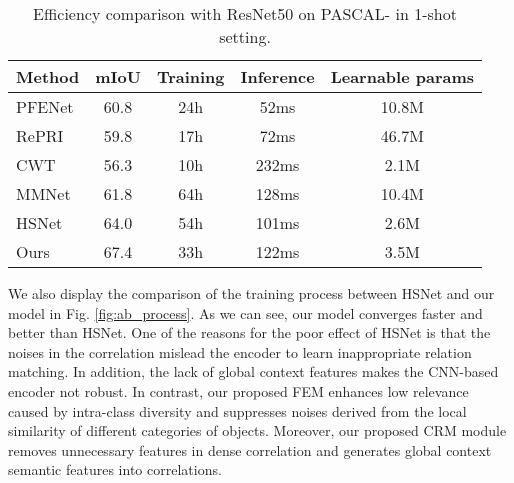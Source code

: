 \documentclass[journal]{IEEEtran}
\begin{document}
\begin{table}[t]
\renewcommand\arraystretch{1.2}
	\caption{Efficiency comparison with ResNet50 on PASCAL-\cite{shaban2017one} in 1-shot setting.}
	\label{table:efficiency}
	
	\begin{center}
		\begin{tabular}{lcccc}
			\hline
			\textbf{Method} & \textbf{mIoU} & \textbf{Training} & \textbf{Inference} & \textbf{  Learnable params}\\
			\hline
			 {PFENet \cite{tian2020prior} } &  { 60.8 } &  { 24h    } &  { 52ms     } &  { 10.8M}       \\     
			 {RePRI \cite{boudiaf2021few}  } &  { 59.8 } &  { 17h    } &  { 72ms      } &  { 46.7M}           \\   
			 {CWT \cite{lu2021simpler}  } &  { 56.3 } &  { 10h    } &  { 232ms      } &  { 2.1M }    \\     
			 {MMNet \cite{wu2021learning}  } &  { 61.8 } &  { 64h    } &  { 128ms      } &  { 10.4M }   \\ 
			HSNet\cite{min2021hypercorrelation}  & 64.0& 54h &101ms &2.6M  \\
			Ours   &67.4& 33h &122ms &3.5M  \\
			\hline
			
		\end{tabular}
	\end{center}
\end{table}

We also display the comparison of the training process between HSNet and our model in Fig. \ref{fig:ab_process}. As we can see, our model converges faster and better than HSNet. One of the reasons for the poor effect of HSNet is that the noises in the correlation mislead the encoder to learn inappropriate relation matching. In addition, the lack of global context features makes the CNN-based encoder not robust. In contrast, our proposed FEM enhances low relevance caused by intra-class diversity and suppresses noises derived from the local similarity of different categories of objects. Moreover, our proposed CRM module removes unnecessary features in dense correlation and generates global context semantic features into correlations. \par
\end{document}
